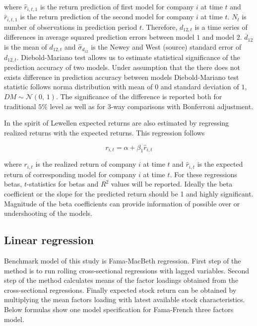 \documentclass{article}
\begin{document}
where $\hat r_{i, t, 1}$ is the return prediction of first model for company $i$ at time $t$ and $\hat r_{i, t, 1}$ is the return prediction of the second model  for company $i$ at time $t$. $N_t$ is number of observations in prediction period $t$. Therefore, $d_{12, t}$ is a time series of differences in average squared prediction errors between model $1$ and model $2$. $\overline{d}_{12}$ is the mean of $d_{12, t}$ and $\hat \sigma_{d_{12}}$ is the Newey and West (source) standard error of $d_{12, t}$. Diebold-Mariano test allows us to estimate statistical significance of the prediction accuracy of two models. Under assumption that the there does not exists difference in prediction accuracy between models Diebold-Mariano test statistic follows norma distribution with mean of $0$ and standard deviation of $1$, $DM \sim \mathcal{N}(0,\, 1)$. The significance of the difference is reported both for traditional $5\%$ level as well as for 3-way comparisons with Bonferroni adjustment.

In the spirit of Lewellen \citeyear{lewellen2015} expected returns are also estimated by regressing realized returns with the expected returns. This regression follows

\begin{equation}
\label{eq:realizedRegression}
r_{i, t} = \alpha + \beta_1 \hat r_{i, t}
\end{equation}

where $r_{i, t}$ is the realized return of company $i$ at time $t$ and $\hat r_{i, t}$ is the expected return of corresponding model for company $i$ at time $t$. For these regressions betas, $t$-statistics for betas and $R^2$ values will be reported. Ideally the beta coefficient or the slope for the predicted return should be 1 and highly significant. Magnitude of the beta coefficients can provide information of possible over or undershooting of the models.

\subsection{Linear regression}
Benchmark model of this study is Fama-MacBeth \citeyear{FamaMacBeth1973} regression. First step of the method is to run rolling cross-sectional regressions with lagged variables. Second step of the method calculates means of the factor loadings obtained from the cross-sectional regressions. Finally expected stock return can be obtained by multiplying the mean factors loading with latest available stock characteristics. Below formulas show one model specification for Fama-French \citeyear{FAMA19933} three factors model.
\end{document}

